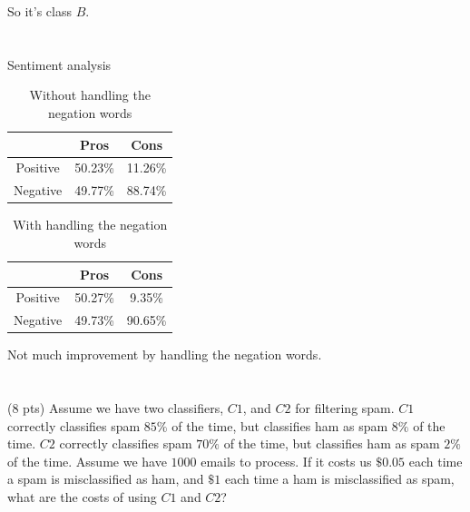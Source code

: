 \documentclass[paper=a4, fontsize=11pt]{scrartcl} %
\begin{document}
So it's class $B$.

\pagebreak

\section{}

\begin{fancyquotes}
  Sentiment analysis
\end{fancyquotes}

\begin{table}[hp]
  \centering
  \begin{tabular}[hp]{ccc}
    & Pros & Cons \\
    \hline
    Positive & 50.23\% & 11.26\% \\
    Negative & 49.77\% & 88.74\%
  \end{tabular}
  \caption{Without handling the negation words}
\end{table}

\begin{table}[hp]
  \centering
  \begin{tabular}[hp]{ccc}
    & Pros & Cons \\
    \hline
    Positive & 50.27\% & 9.35\% \\
    Negative & 49.73\% & 90.65\%
  \end{tabular}
  \caption{With handling the negation words}
\end{table}

Not much improvement by handling the negation words.

\pagebreak


\section{}

\subsection{}
\begin{fancyquotes}
  (8 pts) Assume we have two classifiers, $C1$, and $C2$ for filtering
  spam. $C1$ correctly classifies spam $85\%$ of the time, but
  classifies ham as spam $8\%$ of the time. $C2$ correctly classifies
  spam $70\%$ of the time, but classifies ham as spam $2\%$ of the
  time. Assume we have $1000$ emails to process. If it costs us
  $\$0.05$ each time a spam is misclassified as ham, and $\$1$ each
  time a ham is misclassified as spam, what are the costs of using
  $C1$ and $C2$?
\end{fancyquotes}
\end{document}
